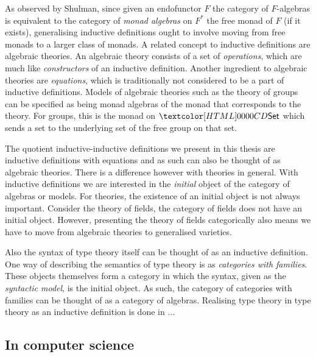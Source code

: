 As observed by Shulman, since given an endofunctor $F$ the category of
$F$-algebras is equivalent to the category of \emph{monad algebras} on
$F^*$ the free monad of $F$ (if it exists), generalising inductive
definitions ought to involve moving from free monads to a larger class
of monads. A related concept to inductive definitions are algebraic
theories. An algebraic theory consists of a set of \emph{operations},
which are much like \emph{constructors} of an inductive
definition. Another ingredient to algebraic theories are
\emph{equations}, which is traditionally not considered to be a part
of inductive definitions. Models of algebraic theories such as the
theory of groups can be specified as being monad algebras of the monad
that corresponds to the theory. For groups, this is the monad on
$\Set$ which sends a set to the underlying set of the free group on
that set.

The quotient inductive-inductive definitions we present in this thesis
are inductive definitions with equations and as such can also be
thought of as algebraic theories. There is a difference however with
theories in general. With inductive definitions we are interested in
the \emph{initial} object of the category of algebras or models. For
theories, the existence of an initial object is not always
important. Consider the theory of fields, the category of fields does
not have an initial object. However, presenting the theory of fields
categorically also means we have to move from algebraic theories to
generalised varieties. 

Also the syntax of type theory itself can be thought of as an
inductive definition. One way of describing the semantics of type
theory is as \emph{categories with families}. These objects themselves
form a category in which the syntax, given as the \emph{syntactic
  model}, is the initial object. As such, the category of categories
with families can be thought of as a category of algebras. Realising
type theory in type theory as an inductive definition is done in ...

\subsection{In computer science}

